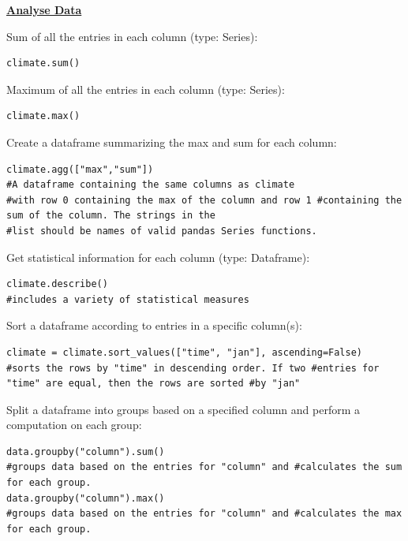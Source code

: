{\centering\underline{\textbf{Analyse Data}} \par}
Sum of all the entries in each column (type: Series):
\begin{lstlisting}
climate.sum()
\end{lstlisting}
Maximum of all the entries in each column (type: Series):
\begin{lstlisting}
climate.max()
\end{lstlisting}
Create a dataframe summarizing the max and sum for each column:
\begin{lstlisting}
climate.agg(["max","sum"])
#A dataframe containing the same columns as climate
#with row 0 containing the max of the column and row 1 #containing the sum of the column. The strings in the 
#list should be names of valid pandas Series functions. 
\end{lstlisting}
Get statistical information for each column (type: Dataframe):
\begin{lstlisting}
climate.describe()
#includes a variety of statistical measures
\end{lstlisting}
Sort a dataframe according to entries in a specific column(s):
\begin{lstlisting}
climate = climate.sort_values(["time", "jan"], ascending=False)
#sorts the rows by "time" in descending order. If two #entries for "time" are equal, then the rows are sorted #by "jan"
\end{lstlisting}
Split a dataframe into groups based on a specified column and perform a computation on each group:
\begin{lstlisting}
data.groupby("column").sum() 
#groups data based on the entries for "column" and #calculates the sum for each group.
data.groupby("column").max()
#groups data based on the entries for "column" and #calculates the max for each group.
\end{lstlisting}